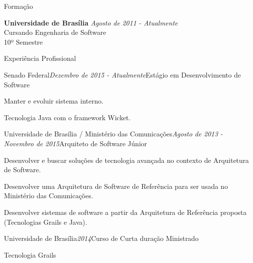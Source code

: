 \documentclass{resume} %
\begin{document}

\begin{rSection}{Formação}

{\bf Universidade de Brasília} \hfill {\em Agosto de 2011 - Atualmente} \\ 
Cursando Engenharia de Software \\
10º Semestre \\

\end{rSection}


\begin{rSection}{Experiência Profissional}

\begin{rSubsection}{Senado Federal}{\em Dezembro de 2015 - Atualmente}{Estágio em Desenvolvimento de Software}{}
\item Manter e evoluir sistema interno.
\item Tecnologia Java com o framework Wicket.
\end{rSubsection}

\begin{rSubsection}{Universidade de Brasília / Ministério das Comunicações}{\em Agosto de 2013 - Novembro de 2015}{Arquiteto de Software Júnior}{}
\item Desenvolver e buscar soluções de tecnologia avançada no contexto de Arquitetura de
Software.
\item Desenvolver uma Arquitetura de Software de Referência para ser usada no Ministério
das Comunicações.
\item Desenvolver sistemas de software a partir da Arquitetura de Referência proposta (Tecnologias Grails e Java).
\end{rSubsection}


\begin{rSubsection}{Universidade de Brasília}{\em 2014}{Curso de Curta duração Ministrado}{}
\item Tecnologia Grails
\end{rSubsection}

\end{rSection}
\end{document}
